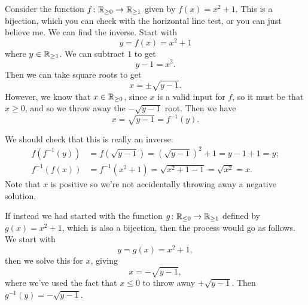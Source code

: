 \documentclass[fleqn]{LectureClass/LectureClass}
\begin{document}
    \begin{exm}{}{}
        Consider the function \(f \colon \mathbb{R}_{\ge 0} \to \mathbb{R}_{\ge 1}\) given by \(f(x) = x^2 + 1\).
        This is a bijection, which you can check with the horizontal line test, or you can just believe me.
        We can find the inverse.
        Start with
        \begin{equation}
            y = f(x) = x^2 + 1
        \end{equation}
        where \(y \in \mathbb{R}_{\ge 1}\).
        We can subtract \(1\) to get
        \begin{equation}
            y - 1 = x^2.
        \end{equation}
        Then we can take square roots to get
        \begin{equation}
            x = \pm \sqrt{y - 1}.
        \end{equation}
        However, we know that \(x \in \mathbb{R}_{\ge 0}\), since \(x\) is a valid input for \(f\), so it must be that \(x \ge 0\), and so we throw away the \(-\sqrt{y - 1}\) root.
        Then we have
        \begin{equation}
            x = \sqrt{y - 1} = f^{-1}(y).
        \end{equation}
        
        We should check that this is really an inverse:
        \begin{align}
            f(f^{-1}(y)) &= f(\sqrt{y - 1}) = (\sqrt{y - 1})^2 + 1 = y - 1 + 1 = y;\\
            f^{-1}(f(x)) &= f^{-1}(x^2 + 1) = \sqrt{x^2 + 1 - 1} = \sqrt{x^2} = x.
        \end{align}
        Note that \(x\) is positive so we're not accidentally throwing away a negative solution.
        
        If instead we had started with the function \(g \colon \mathbb{R}_{\le 0} \to \mathbb{R}_{\ge 1}\) defined by \(g(x) = x^2 + 1\), which is also a bijection, then the process would go as follows.
        We start with
        \begin{equation}
            y = g(x) = x^2 + 1,
        \end{equation}
        then we solve this for \(x\), giving
        \begin{equation}
            x = -\sqrt{y - 1},
        \end{equation}
        where we've used the fact that \(x \le 0\) to throw away \(+\sqrt{y - 1}\).
        Then \(g^{-1}(y) = -\sqrt{y - 1}\).
        

\end{exm}
\end{document}
